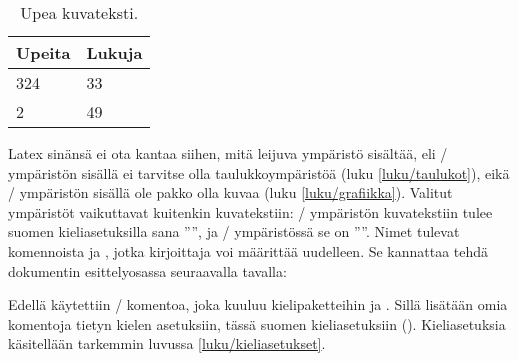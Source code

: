 \begin{esimerkki*}

\begin{koodilohko}
\begin{table}
  \begin{center}
    \renewcommand{\arraystretch}{1.3}
    \begin{tabular}{ll}
      Upeita & Lukuja \\
      \hline
      324 & 33 \\
      2   & 49 \\
      \hline
    \end{tabular}
  \end{center}
  \caption{Upea kuvateksti.}
\end{table}
\end{koodilohko}

  \caption{Leijuvan taulukon toteuttaminen \-/
    ympäristön avulla. Varsinainen taulukko syntyy ympäristön
     avulla}
  \label{esim/leijuosat-perus}
\end{esimerkki*}

Latex sinänsä ei ota kantaa siihen, mitä leijuva ympäristö sisältää, eli
\-/ ympäristön sisällä ei tarvitse olla
taulukkoympäristöä (luku \ref{luku/taulukot}), eikä
\-/ ympäristön sisällä ole pakko olla kuvaa (luku
\ref{luku/grafiikka}). Valitut ympäristöt vaikuttavat kuitenkin
kuvatekstiin: \-/ ympäristön kuvatekstiin tulee suomen
kieliasetuksilla sana ''\tablename'', ja \-/
ympäristössä se on ''\figurename''. Nimet tulevat komennoista
 ja , jotka kirjoittaja voi
määrittää uudelleen. Se kannattaa tehdä dokumentin esittelyosassa
seuraavalla tavalla:

\begin{koodilohkosis}
\addto{\captionsfinnish}{
  \renewcommand{\tablename}{Taulukko}
  \renewcommand{\figurename}{Kuva}
}
\end{koodilohkosis}

\noindent
Edellä käytettiin \-/ komentoa, joka kuuluu
kielipaketteihin  ja . Sillä
lisätään omia komentoja tietyn kielen asetuksiin, tässä suomen
kieliasetuksiin (). Kieliasetuksia käsitellään
tarkemmin luvussa \ref{luku/kieliasetukset}.

